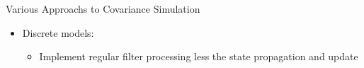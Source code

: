 \begin{frame}
Various Approachs to Covariance Simulation
\begin{itemize}
  \item Discrete models:
	\begin{itemize}
		\item Implement regular filter processing less the state propagation and update
	\end{itemize}
\end{itemize} 
\end{frame}


